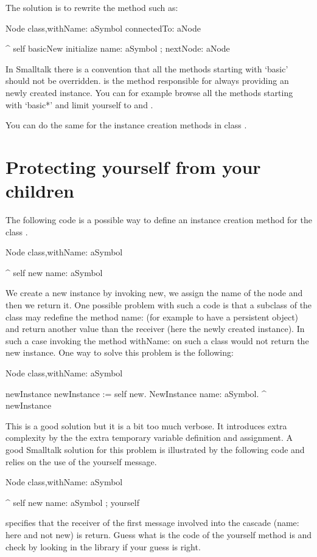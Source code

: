 The solution is to rewrite the method such as:
\begin{scode}
Node class\sep{}withName: aSymbol connectedTo: aNode

 ^  self basicNew initialize name: aSymbol ; nextNode: aNode
\end{scode}

In Smalltalk there is a convention that all the methods starting with `basic' should not be overridden.  is the method responsible for always providing an newly created instance. You can for example browse all the methods starting with `basic*' 
and limit yourself to  and .

You can do the same for the instance creation methods in class .


\section{Protecting yourself from your children}
The following code is a possible way to define an instance creation method for the class .

\begin{scode}
Node class\sep{}withName: aSymbol

 ^ self new name: aSymbol 
\end{scode}

We create a new instance by invoking new, we assign the name of the node and then we return it. One possible problem with such a code is that a subclass of the class  may redefine the method name: (for example to have a persistent object) and return another value than the receiver (here the newly created instance). In such a case invoking the method withName: on such a class would not return the new instance. One way to solve this problem is the following:


\begin{scode}
Node class\sep{}withName: aSymbol

 \stBar newInstance \stBar
 newInstance := self new.
 NewInstance name: aSymbol.
 ^ newInstance
\end{scode}


This is a good solution but it is a bit too much verbose. It introduces extra complexity by the the extra temporary variable definition and assignment. A good Smalltalk solution for this problem is illustrated by the following code and relies on the use of the yourself message. 


\begin{scode}
Node class\sep{}withName: aSymbol

   ^ self new name: aSymbol ; yourself
\end{scode}

 specifies that the receiver of the first message involved into the cascade (name: here and not new) is return. Guess what is the code of the yourself method is and check by looking in the library if your guess is right.




\ifx\wholebook\relax\else\fi
